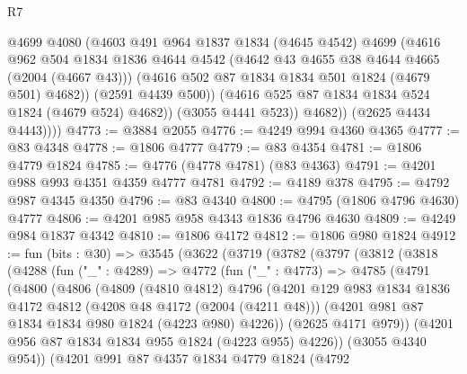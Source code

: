\begin{lexlean}{R7}
\begin{coremodule}
                  @4699
                  @4080
                  (@4603
                    @491
                    @964
                    @1837
                    @1834
                    (@4645 @4542)
                    @4699
                    (@4616
                      @962
                      @504
                      @1834
                      @1836
                      @4644
                      @4542
                      (@4642 @43 @4655 @38 @4644 @4665 (@2004 (@4667 @43)))
                      (@4616 @502 @87 @1834 @1834 @501 @1824 (@4679 @501) @4682))
                    (@2591 @4439 @500))
                  (@4616 @525 @87 @1834 @1834 @524 @1824 (@4679 @524) @4682))
                (@3055 @4441 @523))
              @4682))
          (@2625 @4434 @4443))))
@4773 := @3884 @2055
@4776 := @4249 @994 @4360 @4365
@4777 := @83 @4348
@4778 := @1806 @4777
@4779 := @83 @4354
@4781 := @1806 @4779 @1824
@4785 := @4776 (@4778 @4781) (@83 @4363)
@4791 := @4201 @988 @993 @4351 @4359 @4777 @4781
@4792 := @4189 @378
@4795 := @4792 @987 @4345 @4350
@4796 := @83 @4340
@4800 := @4795 (@1806 @4796 @4630) @4777
@4806 := @4201 @985 @958 @4343 @1836 @4796 @4630
@4809 := @4249 @984 @1837 @4342
@4810 := @1806 @4172
@4812 := @1806 @980 @1824
@4912 := fun (bits : @30) =>
  @3545
    (@3622
      (@3719
        (@3782
          (@3797
            (@3812
              (@3818
                (@4288
                  (fun ("_" : @4289) =>
                  @4772
                    (fun ("_" : @4773) =>
                    @4785
                      (@4791
                        (@4800
                          (@4806
                            (@4809
                              (@4810 @4812)
                              @4796
                              (@4201
                                @129
                                @983
                                @1834
                                @1836
                                @4172
                                @4812
                                (@4208 @48 @4172 (@2004 (@4211 @48)))
                                (@4201 @981 @87 @1834 @1834 @980 @1824 (@4223 @980) @4226))
                              (@2625 @4171 @979))
                            (@4201 @956 @87 @1834 @1834 @955 @1824 (@4223 @955) @4226))
                          (@3055 @4340 @954))
                        (@4201
                          @991
                          @87
                          @4357
                          @1834
                          @4779
                          @1824
                          (@4792

\end{coremodule}
\end{lexlean}

